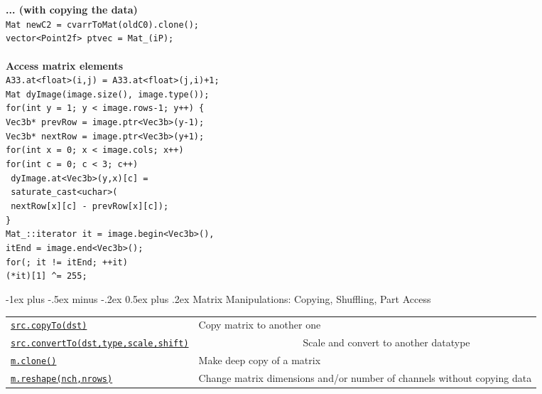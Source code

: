 \documentclass[10pt,landscape]{article}
\makeatletter
\renewcommand{\section}{\@startsection{section}{1}{0mm}%
                                {-1ex plus -.5ex minus -.2ex}%
                                {0.5ex plus .2ex}%
                                {\normalfont\large\bfseries}}
\makeatother
\begin{document}
\begin{multicols}{3}
\begin{tabbing}
\textbf{... (with copying the data)}\\
\> \texttt{Mat newC2 = cvarrToMat(oldC0).clone();}\\
\> \texttt{vector<Point2f> ptvec = Mat\_<Point2f>(iP);}\\

\>\\
\textbf{Access matrix elements}\\
\> \texttt{A33.at<float>(i,j) = A33.at<float>(j,i)+1;}\\
\> \texttt{Mat dyImage(image.size(), image.type());}\\
\> \texttt{for(int y = 1; y < image.rows-1; y++) \{}\\
\> \> \texttt{Vec3b* prevRow = image.ptr<Vec3b>(y-1);}\\
\> \> \texttt{Vec3b* nextRow = image.ptr<Vec3b>(y+1);}\\
\> \> \texttt{for(int x = 0; x < image.cols; x++)}\\
\> \> \> \texttt{for(int c = 0; c < 3; c++)}\\
\> \> \> \texttt{  dyImage.at<Vec3b>(y,x)[c] =}\\
\> \> \> \texttt{    saturate\_cast<uchar>(}\\
\> \> \> \texttt{       nextRow[x][c] - prevRow[x][c]);}\\
\> \texttt{\} }\\
\> \texttt{Mat\_<Vec3b>::iterator it = image.begin<Vec3b>(),}\\
\> \> \texttt{itEnd = image.end<Vec3b>();}\\
\> \texttt{for(; it != itEnd; ++it)}\\
\> \> \texttt{(*it)[1] \textasciicircum{}= 255;}\\

\end{tabbing}

\section{Matrix Manipulations: Copying, Shuffling, Part Access}
\begin{tabular}{@{}p{\the\MyLen}%
                @{}p{\linewidth-\the\MyLen}@{}}
\texttt{\href{http://docs.opencv.org/modules/core/doc/basic_structures.html\#mat-copyto}{src.copyTo(dst)}} & Copy matrix to another one \\
\texttt{\href{http://docs.opencv.org/modules/core/doc/basic_structures.html\#mat-convertto}{src.convertTo(dst,type,scale,shift)}} & \ \ \ \ \ \ \ \ \ \ \ \ \ \ \ \ \ \ \ \ \ Scale and convert to another datatype \\
\texttt{\href{http://docs.opencv.org/modules/core/doc/basic_structures.html\#mat-clone}{m.clone()}} & Make deep copy of a matrix \\
\texttt{\href{http://docs.opencv.org/modules/core/doc/basic_structures.html\#mat-reshape}{m.reshape(nch,nrows)}} & Change matrix dimensions and/or number of channels without copying data \\


\end{tabular}
\end{multicols}
\end{document}

